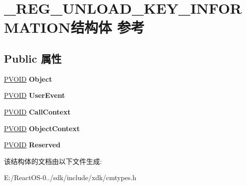 \hypertarget{struct___r_e_g___u_n_l_o_a_d___k_e_y___i_n_f_o_r_m_a_t_i_o_n}{}\section{\+\_\+\+R\+E\+G\+\_\+\+U\+N\+L\+O\+A\+D\+\_\+\+K\+E\+Y\+\_\+\+I\+N\+F\+O\+R\+M\+A\+T\+I\+O\+N结构体 参考}
\label{struct___r_e_g___u_n_l_o_a_d___k_e_y___i_n_f_o_r_m_a_t_i_o_n}
\subsection*{Public 属性}
\begin{DoxyCompactItemize}
\item 
\mbox{\label{struct___r_e_g___u_n_l_o_a_d___k_e_y___i_n_f_o_r_m_a_t_i_o_n_a6842bb47c26cc4d7859c4bdb9d5b16dc}} 
\hyperlink{interfacevoid}{P\+V\+O\+ID} {\bfseries Object}
\item 
\mbox{\label{struct___r_e_g___u_n_l_o_a_d___k_e_y___i_n_f_o_r_m_a_t_i_o_n_a2b74bc383e9edc142b23f4d4f201d0ab}} 
\hyperlink{interfacevoid}{P\+V\+O\+ID} {\bfseries User\+Event}
\item 
\mbox{\label{struct___r_e_g___u_n_l_o_a_d___k_e_y___i_n_f_o_r_m_a_t_i_o_n_a71aeac1d3b73436fa4e1e727169eecb9}} 
\hyperlink{interfacevoid}{P\+V\+O\+ID} {\bfseries Call\+Context}
\item 
\mbox{\label{struct___r_e_g___u_n_l_o_a_d___k_e_y___i_n_f_o_r_m_a_t_i_o_n_a27112559542c4fc0eae4f6082c6c4332}} 
\hyperlink{interfacevoid}{P\+V\+O\+ID} {\bfseries Object\+Context}
\item 
\mbox{\label{struct___r_e_g___u_n_l_o_a_d___k_e_y___i_n_f_o_r_m_a_t_i_o_n_a0ff6241f1c459d03fdd14d8509bb4178}} 
\hyperlink{interfacevoid}{P\+V\+O\+ID} {\bfseries Reserved}
\end{DoxyCompactItemize}


该结构体的文档由以下文件生成\+:\begin{DoxyCompactItemize}
\item 
E\+:/\+React\+O\+S-\/0../sdk/include/xdk/cmtypes.\+h\end{DoxyCompactItemize}
